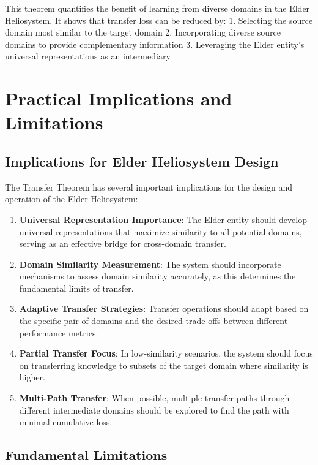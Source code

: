 This theorem quantifies the benefit of learning from diverse domains in the Elder Heliosystem. It shows that transfer loss can be reduced by:
1. Selecting the source domain most similar to the target domain
2. Incorporating diverse source domains to provide complementary information
3. Leveraging the Elder entity's universal representations as an intermediary

\section{Practical Implications and Limitations}

\subsection{Implications for Elder Heliosystem Design}

The Transfer Theorem has several important implications for the design and operation of the Elder Heliosystem:

\begin{enumerate}
    \item \textbf{Universal Representation Importance}: The Elder entity should develop universal representations that maximize similarity to all potential domains, serving as an effective bridge for cross-domain transfer.
    
    \item \textbf{Domain Similarity Measurement}: The system should incorporate mechanisms to assess domain similarity accurately, as this determines the fundamental limits of transfer.
    
    \item \textbf{Adaptive Transfer Strategies}: Transfer operations should adapt based on the specific pair of domains and the desired trade-offs between different performance metrics.
    
    \item \textbf{Partial Transfer Focus}: In low-similarity scenarios, the system should focus on transferring knowledge to subsets of the target domain where similarity is higher.
    
    \item \textbf{Multi-Path Transfer}: When possible, multiple transfer paths through different intermediate domains should be explored to find the path with minimal cumulative loss.
\end{enumerate}

\subsection{Fundamental Limitations}

